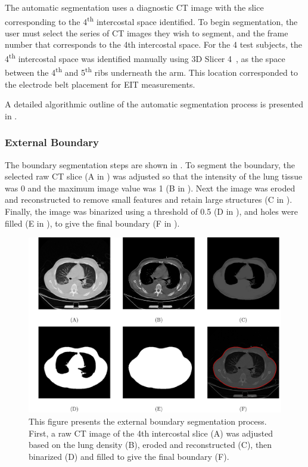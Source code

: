 The automatic segmentation uses a diagnostic CT image 
with the slice corresponding to the 4\textsuperscript{th} intercostal space 
identified. 
To begin segmentation, the user must select the series of CT images they 
wish to segment, and the frame number that corresponds to the 4th intercostal 
space. For the 4 test subjects, the 4\textsuperscript{th} 
intercostal space was identified manually using
3D Slicer 4~\parencite{fedorov_3d_2012}, as the space between the
4\textsuperscript{th} and 5\textsuperscript{th} ribs underneath the arm.
This location corresponded to the electrode belt placement for EIT measurements.

A detailed algorithmic outline of the automatic segmentation process is 
presented in .

\subsubsection{External Boundary} \label{sec:ext_seg}
The boundary segmentation steps are shown in .
To segment the boundary, the selected raw CT slice 
(A in ) 
was adjusted so that the
intensity of the lung tissue was 0 and the maximum image value was 1 
(B in ). 
Next the image was eroded and reconstructed 
to remove small features and retain large structures 
(C in ).
Finally, the image was binarized using a threshold of 0.5 (D in ),
and holes were filled (E in ), 
to give the final boundary (F in ).

\begin{figure}[H]
	\centering
	\includegraphics[width=\textwidth]{chapter5-CT_to_mesh/imgs/boundary_seg_methods.pdf}
	\caption[Boundary segmentation methods.]{\label{fig:ext_seg_methods}%
	This figure presents the external boundary segmentation process. First,
	a raw CT image of the 4th intercostal slice (A) 
	was adjusted based on the lung density (B), 
	eroded and reconstructed (C), then binarized (D) and 
	filled to give the final boundary (F).
	}
\end{figure}

